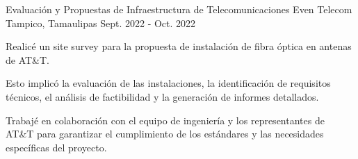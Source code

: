 \begin{cventries}
  \cventry
    {Evaluación y Propuestas de Infraestructura de
    Telecomunicaciones} %
    {Even Telecom} %
    {Tampico, Tamaulipas} %
    {Sept. 2022 - Oct. 2022} %
    {
      \begin{cvitems} %
        \item {Realicé un site survey para la propuesta de
        instalación de fibra óptica en antenas de AT\&T.}
        \item {Esto implicó la evaluación de las instalaciones, la
        identificación de requisitos técnicos, el análisis
        de factibilidad y la generación de informes
        detallados.}
        \item { Trabajé en colaboración con
        el equipo de ingeniería y los representantes de
        AT\&T para garantizar el cumplimiento de los
        estándares y las necesidades específicas del
        proyecto.}
      \end{cvitems}
    }


\end{cventries}
